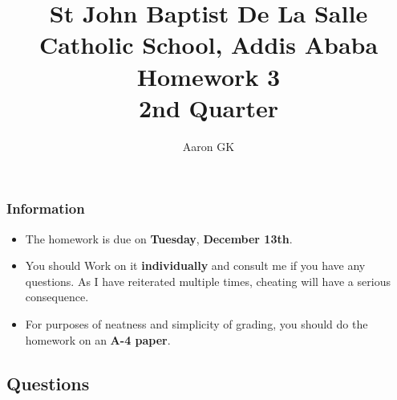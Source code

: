 \documentclass[9pt,addpoints]{exam}
\author{Aaron GK}
\begin{document}
	\title{St John Baptist De La Salle Catholic School, Addis Ababa\\
		\large Homework 3 \\
		2nd Quarter}
	\maketitle
	\begin{center}
		\subsubsection*{Information}
		\begin{itemize}
			\item The homework is due on \textbf{Tuesday}, \textbf{December 13th}.
			\item You should Work on it \textbf{individually} and consult me if you have any questions. As I have reiterated multiple times, cheating will have a serious consequence.
			\item For purposes of neatness and simplicity of grading, you should do the homework on an \textbf{A-4 paper}.
		\end{itemize}
	\end{center}
	\begin{center}
		\subsection*{Questions}
	\end{center}
	
\end{document}
